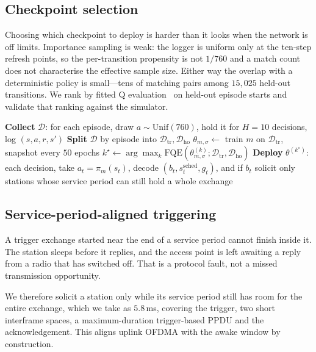 \subsection{Checkpoint selection}

Choosing which checkpoint to deploy is harder than it looks when the network is
off limits. Importance sampling is weak: the logger is uniform only at the ten-step refresh
points, so the per-transition propensity is not $1/760$ and a match count does
not characterise the effective sample size. Either way the overlap with a
deterministic policy is small---tens of matching pairs among $15{,}025$
held-out transitions. We rank by fitted Q evaluation~\cite{le2019fqe} on
held-out episode starts and validate that ranking against the simulator.

\begin{algorithm}[t]
\caption{Offline joint TWT/OFDMA control}
\label{alg:pipeline}
\small
\begin{algorithmic}[1]
\STATE \textbf{Collect} $\mathcal{D}$: for each episode, draw $a \sim \mathrm{Unif}(760)$,
       hold it for $H=10$ decisions, log $(s,a,r,s')$
\STATE \textbf{Split} $\mathcal{D}$ by episode into $\mathcal{D}_{\mathrm{tr}}, \mathcal{D}_{\mathrm{ho}}$
  \STATE $\theta_{m,\sigma} \leftarrow$ train $m$ on $\mathcal{D}_{\mathrm{tr}}$, snapshot every $50$ epochs
  \STATE $k^\star \leftarrow \arg\max_k \mathrm{FQE}(\theta^{(k)}_{m,\sigma}; \mathcal{D}_{\mathrm{tr}}, \mathcal{D}_{\mathrm{ho}})$
\ENDFOR
\STATE \textbf{Deploy} $\theta^{(k^\star)}$: each decision, take
      $a_t = \pi_m(s_t)$, decode $(b_t, s^{\mathrm{sched}}_t, g_t)$, and if
      $b_t$ solicit only stations whose service period can still hold a whole
      exchange 
\end{algorithmic}
\end{algorithm}

\subsection{Service-period-aligned triggering}

A trigger exchange started near the end of a service period cannot finish inside
it. The station sleeps before it replies, and the access point is left awaiting
a reply from a radio that has switched off. That is a protocol fault, not a
missed transmission opportunity.

We therefore solicit a station only while its service period still has room for
the entire exchange, which we take as $5.8$\,ms, covering the trigger, two short
interframe spaces, a maximum-duration trigger-based PPDU and the acknowledgement.
This aligns uplink OFDMA with the awake window by construction.
